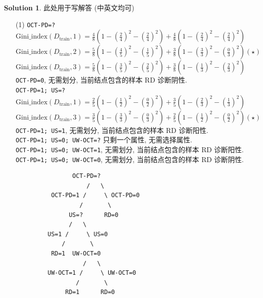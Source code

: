 \documentclass[a4paper]{article}
\numberwithin{equation}{section}
\theoremstyle{definition}
\newtheorem*{solution}{Solution}
\newcommand\sbr[1]{\left( #1 \right)}
\begin{document}
\begin{solution}
    此处用于写解答 (中英文均可)
    \begin{itemize}
        \item[(1)] \texttt{OCT-PD=?} \\
              $\mathrm{Gini\_index}(D_{\mathrm{train}}, 1) = \frac{4}{8} \sbr{1 - \sbr{\frac{2}{4}}^2 - \sbr{\frac{2}{4}}^2} + \frac{4}{8} \sbr{1 - \sbr{\frac{2}{4}}^2 - \sbr{\frac{2}{4}}^2}$ \\
              $\mathrm{Gini\_index}(D_{\mathrm{train}}, 2) = \frac{5}{8} \sbr{1 - \sbr{\frac{4}{5}}^2 - \sbr{\frac{1}{5}}^2} + \frac{3}{8} \sbr{1 - \sbr{\frac{3}{3}}^2 - \sbr{\frac{0}{3}}^2} (\star)$ \\
              $\mathrm{Gini\_index}(D_{\mathrm{train}}, 3) = \frac{5}{8} \sbr{1 - \sbr{\frac{3}{5}}^2 - \sbr{\frac{2}{5}}^2} + \frac{3}{8} \sbr{1 - \sbr{\frac{1}{3}}^2 - \sbr{\frac{2}{3}}^2}$ \\
              \texttt{OCT-PD=0}, 无需划分, 当前结点包含的样本 RD 诊断阴性. \\
              \texttt{OCT-PD=1; US=?} \\
              $\mathrm{Gini\_index}(D_{\mathrm{train}}, 1) = \frac{2}{5} \sbr{1 - \sbr{\frac{1}{2}}^2 - \sbr{\frac{0}{2}}^2} + \frac{3}{5} \sbr{1 - \sbr{\frac{2}{3}}^2 - \sbr{\frac{1}{3}}^2}$ \\
              $\mathrm{Gini\_index}(D_{\mathrm{train}}, 3) = \frac{3}{5} \sbr{1 - \sbr{\frac{3}{3}}^2 - \sbr{\frac{0}{3}}^2} + \frac{2}{5} \sbr{1 - \sbr{\frac{1}{2}}^2 - \sbr{\frac{0}{2}}^2} (\star)$ \\
              \texttt{OCT-PD=1; US=1}, 无需划分, 当前结点包含的样本 RD 诊断阳性. \\
              \texttt{OCT-PD=1; US=0; UW-OCT=?} 只剩一个属性, 无需选择属性. \\
              \texttt{OCT-PD=1; US=0; UW-OCT=1}, 无需划分, 当前结点包含的样本 RD 诊断阳性. \\
              \texttt{OCT-PD=1; US=0; UW-OCT=0}, 无需划分, 当前结点包含的样本 RD 诊断阴性.
              \begin{lstlisting}
                OCT-PD=?
                    /   \
          OCT-PD=1 /     \ OCT-PD=0
                  /       \
               US=?      RD=0
               /   \
         US=1 /     \ US=0
             /       \
          RD=1  UW-OCT=0
                   /   \
         UW-OCT=1 /     \ UW-OCT=0
                 /       \
              RD=1      RD=0
             \end{lstlisting}

\end{itemize}
\end{solution}
\end{document}
